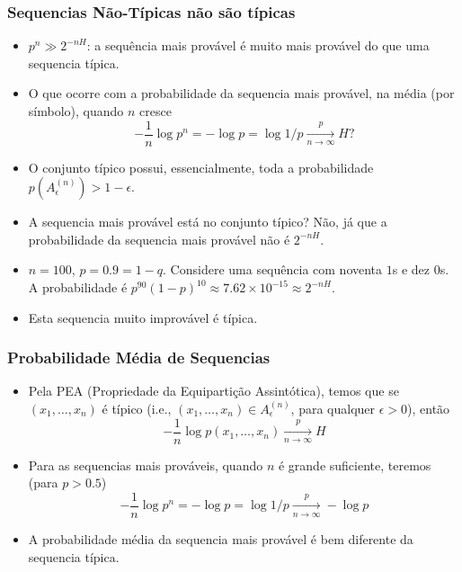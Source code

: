 \begin{frame}%
  \frametitle{Sequencias Não-Típicas não são típicas}
  \begin{itemize}
  \item $p^n \gg 2^{-nH}$: a sequência mais provável é muito mais provável do que uma 
        sequencia típica.
  \item O que ocorre com a probabilidade da sequencia mais provável, na média (por símbolo),
        quando $n$ cresce
        \begin{equation}
        - \frac{1}{n} \log p^n = - \log p = \log 1/p \xrightarrow[n \rightarrow \infty] p H ?
        \end{equation} 
  \item O conjunto típico possui, essencialmente, toda a probabilidade $p(A_\epsilon^{(n)}) > 1 - \epsilon $.
  \item A sequencia mais provável está no conjunto típico? 
        Não, já que a probabilidade da sequencia mais provável não é $2^{-nH}$.
  \item $n=100$, $p=0.9=1-q$. Considere uma sequência com noventa $1$s e dez $0$s.
        A probabilidade é $p^{90}(1-p)^{10} \approx 7.62 \times 10^{-15} \approx 2^{-nH}$.
  \item Esta sequencia muito improvável é típica.
  \end{itemize}
\end{frame}

\begin{frame}%
  \frametitle{Probabilidade Média de Sequencias}
  \begin{itemize}
  \item Pela PEA (Propriedade da Equipartição Assintótica), temos que se 
        $(x_1, \ldots, x_n)$ é típico (i.e., $(x_1, \ldots, x_n) \in A_\epsilon^{(n)}$, 
        para qualquer $\epsilon > 0$), então
        \begin{equation}
        - \frac{1}{n} \log p(x_1, \ldots, x_n) \xrightarrow[n \rightarrow \infty]{p} H 
        \end{equation}
  \item Para as sequencias mais prováveis, quando $n$ é grande suficiente, teremos (para $p>0.5$)
        \begin{equation}
        - \frac{1}{n} \log p^n = - \log p = \log 1/p \xrightarrow[n \rightarrow \infty]{p} - \log p
        \end{equation}
  \item A probabilidade média da sequencia mais provável é bem diferente da sequencia típica.
  \end{itemize}
\end{frame}

